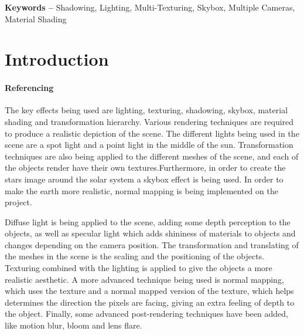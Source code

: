 \documentclass[10pt, a4paper]{article}
\title{\mytitle}
\author{\myauthor\hspace{1em}\\\contact\\Edinburgh Napier University\hspace{0.5em}-\hspace{0.5em}\mymodule}
\date{}
\newcommand{\figuremacro}[5]{
    \begin{figure}[#1]
        \centering
        \texttt{[image: \#2]}
        \caption[#3]{\textbf{#3}#4}
        \label{fig:#2}
    \end{figure}
}
\begin{document}
	
		\hyphenchar{}    
	
	\maketitle
	\begin{abstract}
	The aim of this project was to render a realistic scene using the skills developed in the Computer Graphics Module at Edinburgh Napier University using OpenGL and C++. The scene produced in this project is a solar system, inspired by my adoration for the stars and the Star Wars movies \cite{StarWars}. I was also inspired by some of the previous Computer Graphics Projects \cite{PreviousProjects}. Additionally, I gained inspiration from a Youtube tutorial\cite{Tutorial} for the bloom effect. Advanced 3D effects and techniques are used to accomplish the generated result, such as lighting,shadowing and texturing. These techniques are widely used in a variety of games.
	\figuremacro{h}{MillenniumFalcon}{Millenium Falcon}{ - Chase Camera Inspiration}{1.0}
	\end{abstract}
    
	\textbf{Keywords -- }{Shadowing, Lighting, Multi-Texturing, Skybox, Multiple Cameras, Material Shading}
	\section{Introduction}
    \paragraph{Referencing}

    The key effects being used are lighting, texturing, shadowing, skybox, material shading and transformation hierarchy. Various rendering techniques are required to produce a realistic depiction of the scene. The different lights being used in the scene are a spot light and a point light in the middle of the sun. Transformation techniques are also being applied to the different meshes of the scene, and each of the objects render have their own textures.Furthermore, in order to create the stars image around the solar system a skybox effect is being used. In order to make the earth more realistic, normal mapping is being implemented on the project.
    
    Diffuse light is being applied to the scene, adding some depth perception to the objects, as well as specular light which adds shininess of materials to objects and changes depending on the camera position. The transformation and translating of the meshes in the scene is the scaling and the positioning of the objects. Texturing combined with the lighting is applied to give the objects a more realistic aesthetic.  A more advanced technique being used is normal mapping, which uses the texture and a normal mapped version of the texture, which helps determines the direction the pixels are facing, giving an extra feeling of depth to the object. Finally, some advanced post-rendering techniques have been added, like motion blur, bloom and lens flare.
    
\end{document}
